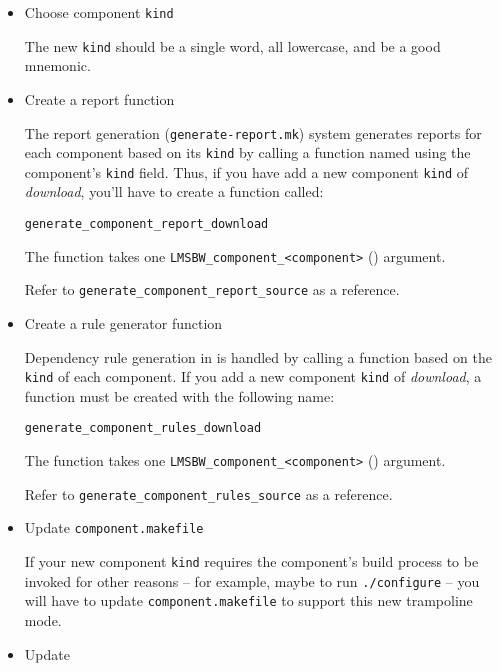 \begin{itemize}
\item Choose component \texttt{kind}

  The new \texttt{kind} should be a single word, all lowercase, and be
  a good mnemonic.

\item Create a report function

  The report generation (\texttt{generate-report.mk}) system generates
  reports for each component based on its \texttt{kind} by calling a
  function named using the component's \texttt{kind} field.  Thus, if
  you have add a new component \texttt{kind} of \emph{download},
  you'll have to create a function called:

\begin{verbatim}
generate_component_report_download
\end{verbatim}

  The function takes one \texttt{LMSBW\_component\_<component>}
  () argument.

  Refer to \texttt{generate\_component\_report\_source} as a
  reference.

\item Create a rule generator function

  Dependency rule generation in \lmsbw is handled by calling a
  function based on the \texttt{kind} of each component.  If you add a
  new component \texttt{kind} of \emph{download}, a function must be
  created with the following name:

\begin{verbatim}
generate_component_rules_download
\end{verbatim}

  The function takes one \texttt{LMSBW\_component\_<component>}
  () argument.

  Refer to \texttt{generate\_component\_rules\_source} as a reference.

\item Update \texttt{component.makefile}

  If your new component \texttt{kind} requires the component's build
  process to be invoked for other reasons -- for example, maybe to run
  \texttt{./configure} -- you will have to update
  \texttt{component.makefile} to support this new trampoline mode.

\item Update \lmsbwconfiguration


\end{itemize}
